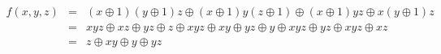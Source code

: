 \begin{eqnarray*}
    f(x,y,z) &=& (x \oplus 1)(y \oplus 1)z \oplus
                (x \oplus 1)y(z \oplus 1) \oplus
                (x \oplus 1)yz \oplus
                x(y \oplus 1)z \\
    &=& xyz \oplus xz \oplus yz \oplus z \oplus
                xyz \oplus xy \oplus yz \oplus y \oplus
                xyz \oplus yz \oplus
                xyz \oplus xz\\
    &=& z \oplus xy \oplus y \oplus yz
\end{eqnarray*}